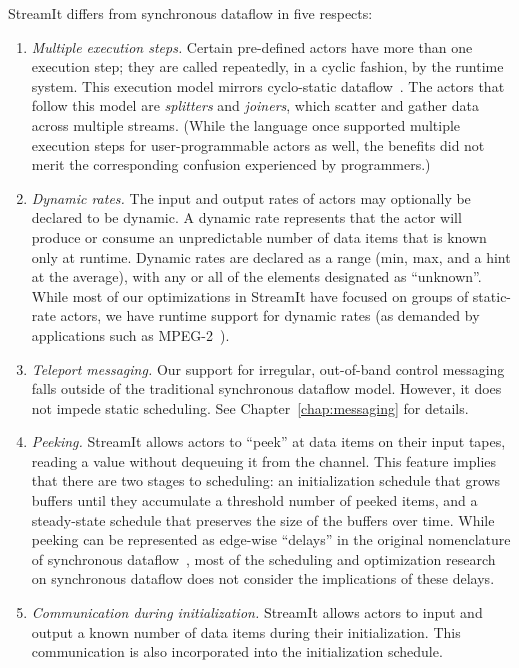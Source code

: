 StreamIt differs from synchronous dataflow in five respects:
\begin{enumerate}

\item {\it Multiple execution steps.}  Certain pre-defined actors have
  more than one execution step; they are called repeatedly, in a
  cyclic fashion, by the runtime system.  This execution model mirrors
  cyclo-static
  dataflow~\cite{bilsen_cyclo-static_1995,parks_comparison_1995}.  The
  actors that follow this model are {\it splitters} and {\it joiners},
  which scatter and gather data across multiple streams.  (While the
  language once supported multiple execution steps for
  user-programmable actors as well, the benefits did not merit the
  corresponding confusion experienced by programmers.)

\item {\it Dynamic rates.}  The input and output rates of actors may
  optionally be declared to be dynamic.  A dynamic rate represents
  that the actor will produce or consume an unpredictable number of
  data items that is known only at runtime.  Dynamic rates are
  declared as a range (min, max, and a hint at the average), with any
  or all of the elements designated as ``unknown''.  While most of our
  optimizations in StreamIt have focused on groups of static-rate
  actors, we have runtime support for dynamic rates (as demanded by
  applications such as MPEG-2~\cite{drake-ipdps06}).

\item {\it Teleport messaging.}  Our support for irregular,
  out-of-band control messaging falls outside of the traditional
  synchronous dataflow model.  However, it does not impede static
  scheduling.  See Chapter~\ref{chap:messaging} for details.

\item {\it Peeking.}  StreamIt allows actors to ``peek'' at data items
  on their input tapes, reading a value without dequeuing it from the
  channel.  This feature implies that there are two stages to
  scheduling: an initialization schedule that grows buffers until they
  accumulate a threshold number of peeked items, and a steady-state
  schedule that preserves the size of the buffers over time.  While
  peeking can be represented as edge-wise ``delays'' in the original
  nomenclature of synchronous dataflow~\cite{lee_static_1987}, most of
  the scheduling and optimization research on synchronous dataflow
  does not consider the implications of these delays.

\item {\it Communication during initialization.}  StreamIt allows
  actors to input and output a known number of data items during their
  initialization.  This communication is also incorporated into the
  initialization schedule.

\end{enumerate}

